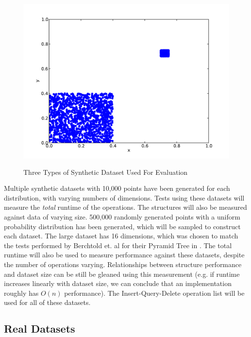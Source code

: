 \begin{figure}
\begin{center}
		\begin{subfloat} {%
			\includegraphics[scale=0.25]{figures/clustered_distribution.pdf}
		}
		\end{subfloat}
	\end{center}

	\caption{Three Types of Synthetic Dataset Used For Evaluation}
	\label{fig:synthetic-data}
\end{figure}

Multiple synthetic datasets with 10,000 points have been generated for each distribution, with varying numbers of dimensions. Tests using these datasets will measure the \textit{total} runtime of the operations. The structures will also be measured against data of varying size. 500,000 randomly generated points with a uniform probability distribution has been generated, which will be sampled to construct each dataset. The large dataset has 16 dimensions, which was chosen to match the tests performed by Berchtold et. al for their Pyramid Tree in \cite{pyramid-tree}. The total runtime will also be used to measure performance against these datasets, despite the number of operations varying. Relationships between structure performance and dataset size can be still be gleaned using this measurement (e.g. if runtime increases linearly with dataset size, we can conclude that an implementation roughly has $O(n)$ performance). The Insert-Query-Delete operation list will be used for all of these datasets. 

\subsection{Real Datasets}

